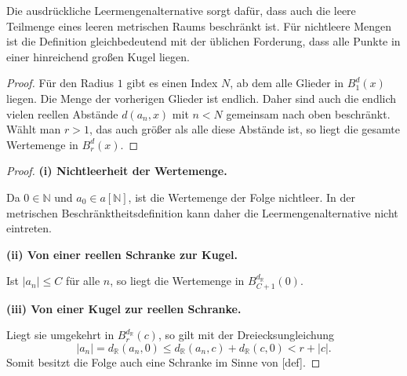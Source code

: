 \documentclass[main.tex]{subfiles}
\begin{document}
Die ausdrückliche Leermengenalternative sorgt dafür, dass auch die leere
Teilmenge eines leeren metrischen Raums beschränkt ist. Für nichtleere Mengen
ist die Definition gleichbedeutend mit der üblichen Forderung, dass alle
Punkte in einer hinreichend großen Kugel liegen.

\begin{proof}
Für den Radius \(1\) gibt es einen Index \(N\), ab dem alle Glieder in
\(B_1^d(x)\) liegen. Die Menge der vorherigen Glieder ist endlich. Daher sind
auch die endlich vielen reellen Abstände \(d(a_n,x)\) mit \(n<N\) gemeinsam
nach oben beschränkt. Wählt man \(r>1\), das auch größer als alle diese
Abstände ist, so liegt die gesamte Wertemenge in \(B_r^d(x)\).
\end{proof}

\begin{proof}
\par\medskip\noindent\textbf{(i) Nichtleerheit der Wertemenge.}\par
Da \(0\in\mathbb N\) und \(a_0\in a[\mathbb N]\), ist die Wertemenge der
Folge nichtleer. In der metrischen Beschränktheitsdefinition kann daher die
Leermengenalternative nicht eintreten.

\par\medskip\noindent\textbf{(ii) Von einer reellen Schranke zur Kugel.}\par
Ist \(|a_n|\leq C\) für alle \(n\), so liegt die Wertemenge in
\(B_{C+1}^{d_{\mathbb R}}(0)\). \par\medskip\noindent\textbf{(iii) Von einer Kugel zur reellen Schranke.}\par
Liegt sie umgekehrt in
\(B_r^{d_{\mathbb R}}(c)\), so gilt mit der Dreiecksungleichung
\[
 |a_n|=d_{\mathbb R}(a_n,0)
 \leq d_{\mathbb R}(a_n,c)+d_{\mathbb R}(c,0)
 <r+|c|.
\]
Somit besitzt die Folge auch eine Schranke im Sinne von
[def].
\end{proof}
\end{document}
